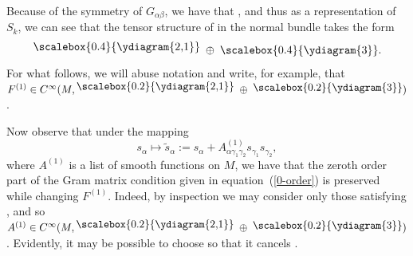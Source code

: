 Because of the symmetry of $G_{\alpha \beta}$, we have that , and thus as a representation of $S_k$, we can see that the tensor structure of  in the normal bundle takes the form
\[
\raisebox{3pt}{\scalebox{0.4}{\ydiagram{2,1}}} \; \oplus \; \scalebox{0.4}{\ydiagram{3}} .
\]
For what follows, we will abuse notation and write, for example, that $F^{(1)} \in C^\infty (M,\raisebox{3pt}{\scalebox{0.2}{\ydiagram{2,1}}} \; \oplus \; \raisebox{2pt}{\scalebox{0.2}{\ydiagram{3}}})$.

Now observe that under the mapping
\[
s_{\alpha} \mapsto \tilde{s}_{\alpha} := s_{\alpha} + A^{(1)}_{\alpha \gamma_1 \gamma_2} s_{\gamma_1} s_{\gamma_2} ,
\]
where $A^{(1)}$ is a list of smooth functions on $M$, we have that the zeroth order part of the Gram matrix condition given in equation~(\ref{0-order}) is preserved while changing $F^{(1)}$. Indeed, by inspection we may consider only those  satisfying , and so $A^{(1)} \in C^\infty (M , \raisebox{3pt}{\scalebox{0.2}{\ydiagram{2,1}}} \; \oplus \; \raisebox{2pt}{\scalebox{0.2}{\ydiagram{3}}})$. Evidently, it may be possible to choose  so that it cancels .

